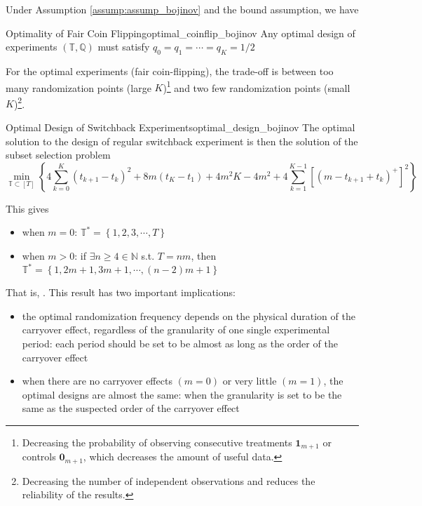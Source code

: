 \documentclass[twoside]{article}
\begin{document}
Under Assumption \ref{assump:assump_bojinov} and the bound assumption, we have 
\begin{theorem}{Optimality of Fair Coin Flipping}{optimal_coinflip_bojinov}
    Any optimal design of experiments $\left(\mathbb{T,Q}\right)$ must satisfy $q_0=q_1=\cdots = q_K = 1/2$
\end{theorem}
For the optimal experiments (fair coin-flipping), the trade-off is between too many randomization points (large $K$)\footnote{Decreasing the probability of observing consecutive treatments $\mathbf{1}_{m+1}$ or controls $\mathbf{0}_{m+1}$, which decreases the amount of useful data.} and two few randomization points (small $K$)\footnote{Decreasing the number of independent observations and reduces the reliability of the results.}.
\begin{theorem}{Optimal Design of Switchback Experiments}{optimal_design_bojinov}
    The optimal solution to the design of regular switchback experiment is then the solution of the subset selection problem
    $$ \min_{\mathbb{T}\subset [T]} \left\{ 4\sum^K_{k=0}\left(t_{k+1}-t_k\right)^2 + 8m\left(t_K-t_1\right) + 4m^2K-4m^2 + 4\sum^{K-1}_{k=1}\left[\left(m-t_{k+1}+t_k\right)^+\right]^2 \right\} $$
\end{theorem}
This gives 
\begin{itemize}
    \item when $m=0$: $\mathbb{T}^* = \left\{1,2,3,\cdots,T\right\}$
    \item when $m>0$: if $\exists n\geq 4\in\mathbb{N}$ s.t. $T=nm$, then $\mathbb{T}^*=\left\{1,2m+1,3m+1,\cdots,(n-2)m+1\right\}$
\end{itemize}
That is, . This result has two important implications:
\begin{itemize}
    \item the optimal randomization frequency depends on the physical duration of the carryover effect, regardless of the granularity of one single experimental period: each period should be set to be almost as long as the order of the carryover effect 
    \item when there are no carryover effects $(m=0)$ or very little $(m=1)$, the optimal designs are almost the same: when the granularity is set to be the same as the suspected order of the carryover effect
\end{itemize}
\end{document}
